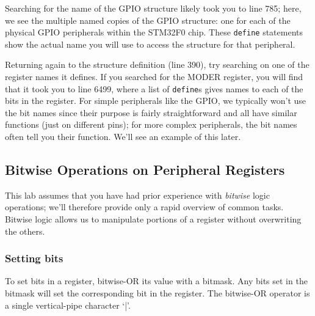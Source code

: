 \documentclass[11pt,fleqn]{book} %
\begin{document}
Searching for the name of the GPIO structure likely took you to line 785; here, we see the multiple named copies of the GPIO structure: one for each of the physical GPIO peripherals within the STM32F0 chip. These \texttt{define} statements show the actual name you will use to access the structure for that peripheral.

Returning again to the structure definition (line 390), try searching on one of the register names it defines. If you searched for the MODER register, you will find that it took you to line 6499, where a list of \texttt{define}s gives names to each of the bits in the register. For simple peripherals like the GPIO, we typically won't use the bit names since their purpose is fairly straightforward and all have similar functions (just on different pins); for more complex peripherals, the bit names often tell you their function. We'll see an example of this later.

%
%    
%    
%    

%


\subsection{Bitwise Operations on Peripheral Registers}

This lab assumes that you have had prior experience with \textit{bitwise} logic operations; we'll therefore provide only a rapid overview of common tasks. Bitwise logic allows us to manipulate portions of a register without overwriting the others.

\subsubsection{Setting bits}
To set bits in a register, bitwise-OR its value with a bitmask. Any bits set in the bitmask will set the corresponding bit in the register. The bitwise-OR operator is a single vertical-pipe character `|'.
\end{document}
